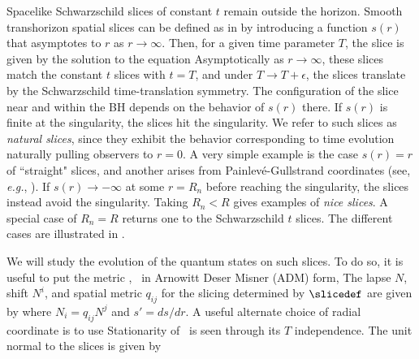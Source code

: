 
Spacelike Schwarzschild slices of constant $t$ remain outside the horizon.  Smooth transhorizon spatial slices can be defined as in  by introducing a function $s(r)$ that asymptotes to $r$ as $r\rightarrow\infty$.  Then, for a given time parameter $T$, the slice is given by the solution to the equation 
%
\eqn{}
%
Asymptotically as $r\rightarrow\infty$, these slices match the constant $t$ slices with $t=T$, and under $T\rightarrow T+ \epsilon$, the slices translate by the Schwarzschild time-translation symmetry.  The configuration of the slice near and within the BH depends on the behavior of $s(r)$ there.  If $s(r)$ is finite at the singularity, the slices hit the singularity.  We refer to such slices as {\it natural slices}, since they exhibit the behavior corresponding to time evolution naturally pulling observers to $r=0$.  A very simple example is the case $s(r)=r$ of ``straight" slices, and another arises from Painlev\'e-Gullstrand coordinates (see, {\it e.g.}, ).  If $s(r)\rightarrow-\infty$ at some $r=R_n$ before reaching the singularity, the slices instead avoid the singularity.  Taking $R_n<R$ gives examples of {\it nice slices}.  A special case of $R_n=R$ returns one to the Schwarzschild $t$ slices.  The different cases are illustrated in \slices.



We will study the evolution of the quantum states on such slices.  To do so, it is useful to put the metric \Schw, \EF\ in Arnowitt Deser Misner (ADM) form, 
%
\eqn{}
%
The lapse $N$, shift $N^i$, and spatial metric $q_{ij}$ for the slicing determined by $\slicedef$ are given by\NVU
%
\eqn{}
%
where $N_i=q_{ij}N^j$ and $s'=ds/dr$.  A useful alternate choice of radial coordinate is to use
%
\eqn{}
%
Stationarity of \admmet\ is seen through its $T$ independence.  The unit normal to the slices is given by
%
\eqn{}
%



